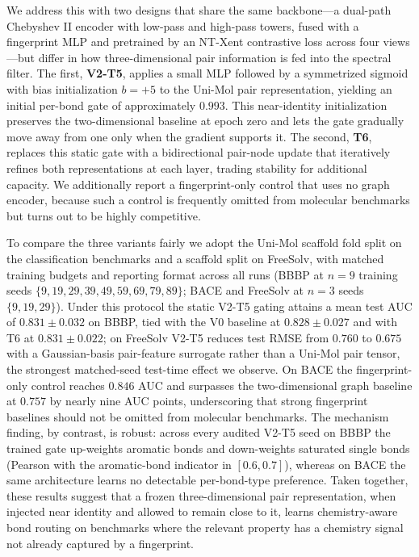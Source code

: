 \documentclass[conference]{IEEEtran}
\begin{document}
We address this with two designs that share the same backbone---a dual-path Chebyshev II encoder with low-pass and high-pass towers, fused with a fingerprint MLP and pretrained by an NT-Xent contrastive loss across four views---but differ in how three-dimensional pair information is fed into the spectral filter. The first, \textbf{V2-T5}, applies a small MLP followed by a symmetrized sigmoid with bias initialization $b{=}{+}5$ to the Uni-Mol pair representation, yielding an initial per-bond gate of approximately $0.993$. This near-identity initialization preserves the two-dimensional baseline at epoch zero and lets the gate gradually move away from one only when the gradient supports it. The second, \textbf{T6}, replaces this static gate with a bidirectional pair-node update that iteratively refines both representations at each layer, trading stability for additional capacity. We additionally report a fingerprint-only control that uses no graph encoder, because such a control is frequently omitted from molecular benchmarks but turns out to be highly competitive.

To compare the three variants fairly we adopt the Uni-Mol scaffold fold split on the classification benchmarks and a scaffold split on FreeSolv, with matched training budgets and reporting format across all runs (BBBP at $n{=}9$ training seeds $\{9, 19, 29, 39, 49, 59, 69, 79, 89\}$; BACE and FreeSolv at $n{=}3$ seeds $\{9, 19, 29\}$). Under this protocol the static V2-T5 gating attains a mean test AUC of $0.831 \pm 0.032$ on BBBP, tied with the V0 baseline at $0.828 \pm 0.027$ and with T6 at $0.831 \pm 0.022$; on FreeSolv V2-T5 reduces test RMSE from $0.760$ to $0.675$ with a Gaussian-basis pair-feature surrogate rather than a Uni-Mol pair tensor, the strongest matched-seed test-time effect we observe. On BACE the fingerprint-only control reaches $0.846$ AUC and surpasses the two-dimensional graph baseline at $0.757$ by nearly nine AUC points, underscoring that strong fingerprint baselines should not be omitted from molecular benchmarks. The mechanism finding, by contrast, is robust: across every audited V2-T5 seed on BBBP the trained gate up-weights aromatic bonds and down-weights saturated single bonds (Pearson with the aromatic-bond indicator in $[0.6, 0.7]$), whereas on BACE the same architecture learns no detectable per-bond-type preference. Taken together, these results suggest that a frozen three-dimensional pair representation, when injected near identity and allowed to remain close to it, learns chemistry-aware bond routing on benchmarks where the relevant property has a chemistry signal not already captured by a fingerprint.
\end{document}

